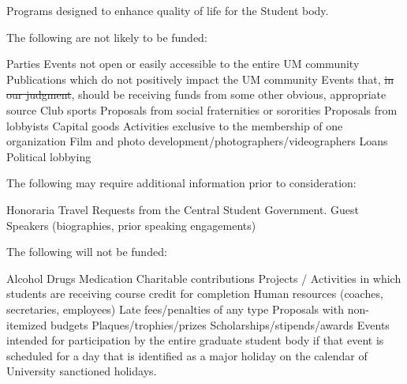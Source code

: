 \begin{enumsubsection}
\begin{enumsubsubsection}
\itemnotoc Programs designed to enhance quality of life for the Student body.
\end{enumsubsubsection}
\itemnotoc The following are not likely to be funded:
\begin{enumsubsubsection}
\itemnotoc Parties 
\itemnotoc Events not open or easily accessible to the entire UM community 
\itemnotoc Publications which do not positively impact the UM community 
\itemnotoc Events that, \st{in our judgment}, should be receiving funds from some 
other obvious, appropriate source 
\itemnotoc Club sports 
\itemnotoc Proposals from social fraternities or sororities 
\itemnotoc Proposals from lobbyists 
\itemnotoc Capital goods 
\itemnotoc Activities exclusive to the membership of one organization 
\itemnotoc Film and photo development/photographers/videographers 
\itemnotoc Loans 
\itemnotoc Political lobbying
\end{enumsubsubsection}
\itemnotoc The following may require additional information prior to consideration:
\begin{enumsubsubsection}
\itemnotoc Honoraria 
\itemnotoc Travel 
\itemnotoc Requests from the Central Student Government. 
\itemnotoc Guest Speakers (biographies, prior speaking engagements)
\end{enumsubsubsection}
\itemnotoc The following will not be funded: 
\begin{enumsubsubsection}
\itemnotoc Alcohol 
\itemnotoc Drugs 
\itemnotoc Medication 
\itemnotoc Charitable contributions 
\itemnotoc Projects / Activities in which students are receiving course credit for 
completion
\itemnotoc Human resources (coaches, secretaries, employees) 
\itemnotoc Late fees/penalties of any type 
\itemnotoc Proposals with non-itemized budgets 
\itemnotoc Plaques/trophies/prizes 
\itemnotoc Scholarships/stipends/awards 
\itemnotoc Events intended for participation by the entire graduate student 
body if that event is scheduled for a day that is identified as a 
major holiday on the calendar of University sanctioned holidays.
\end{enumsubsubsection}
\end{enumsubsection}

